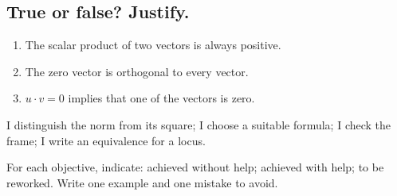 \subsection*{True or false? Justify.}\label{C03-VF}
\begin{enumerate}
\item The scalar product of two vectors is always positive.
\item The zero vector is orthogonal to every vector.
\item $u\cdot v=0$ implies that one of the vectors is zero.
\end{enumerate}
\begin{keypoint}I distinguish the norm from its square; I choose a suitable formula; I check the frame; I write an equivalence for a locus.

For each objective, indicate: achieved without help; achieved with help; to be reworked. Write one example and one mistake to avoid.\end{keypoint}
\endgroup
\ifmxteacher{}\fi
